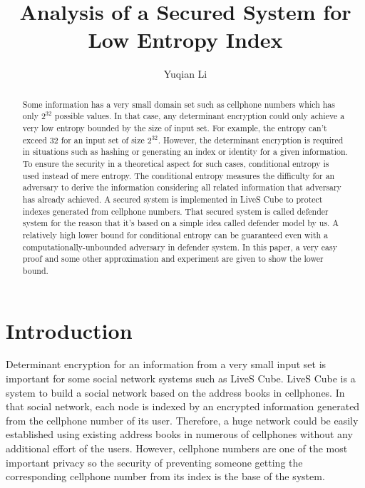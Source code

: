 \documentclass[10pt,a4paper]{article}
\author{Yuqian Li}
\title{Analysis of a Secured System for Low Entropy Index}
\date{}
\begin{document}
\maketitle
\begin{abstract}
	Some information has a very small domain set such as
	cellphone numbers which has only $2^{32}$ possible values. In that case, any
	determinant encryption could only
	achieve a very low entropy bounded by the size of input set.
	For example, the entropy can't exceed $32$ for an input set
	of size $2^{32}$. However, the determinant encryption is required
	in situations such as hashing or generating an index or identity for a
	given information. To ensure the security in a theoretical aspect
	for such cases, conditional entropy is used instead of mere entropy.
	The conditional entropy measures the difficulty for an adversary to
	derive the information considering all related information 
	that adversary has already achieved. A secured system
	is implemented in LiveS Cube to protect indexes generated from cellphone numbers.
	That secured system is called defender system for the reason that it's based
	on a simple idea called defender model by us.
	A relatively high lower
	bound for conditional entropy can be guaranteed even with a computationally-unbounded adversary
	in defender system.
	In this paper, a very easy proof and some other approximation
	and experiment are given to show the lower bound.
\end{abstract}

\section{Introduction}
	Determinant encryption for an information from
	a very small input set is important for some social
	network systems such as LiveS Cube. LiveS Cube is a system to
	build a social network based on the address books in cellphones.
	In that social network, each node is indexed by an encrypted information generated
	from the cellphone number
	of its user. Therefore, a huge network could be easily established
	using existing address books in numerous of cellphones without
	any additional effort of the users. However, cellphone numbers are
	one of the most important privacy so the security of preventing
	someone getting the corresponding cellphone number from its index 
	is the base of the system.
	
\end{document}
